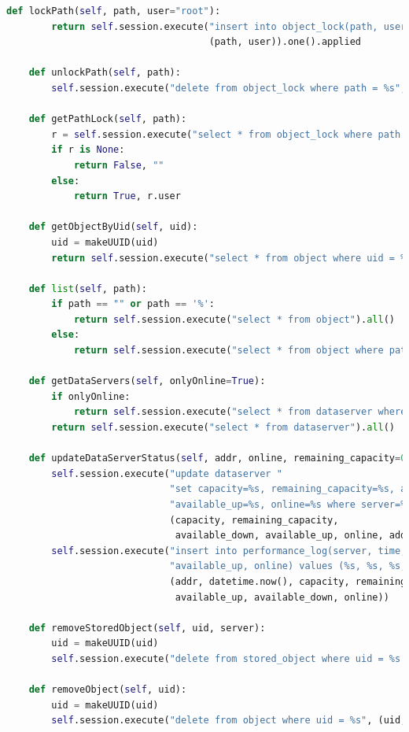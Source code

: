 \documentclass[11pt,a4paper,english]{article}
\begin{document}
\begin{lstlisting}[language=Python, title=Codice]
    def lockPath(self, path, user="root"):
        return self.session.execute("insert into object_lock(path, user) values (%s, %s) if not exists",
                                    (path, user)).one().applied

    def unlockPath(self, path):
        self.session.execute("delete from object_lock where path = %s", (path, ))

    def getPathLock(self, path):
        r = self.session.execute("select * from object_lock where path = %s", (path, )).one()
        if r is None:
            return False, ""
        else:
            return True, r.user

    def getObjectByUid(self, uid):
        uid = makeUUID(uid)
        return self.session.execute("select * from object where uid = %s", (uid, )).one()

    def list(self, path):
        if path == "" or path == '%':
            return self.session.execute("select * from object").all()
        else:
            return self.session.execute("select * from object where path like %s", (path, )).all()

    def getDataServers(self, onlyOnline=True):
        if onlyOnline:
            return self.session.execute("select * from dataserver where online=true allow filtering").all()
        return self.session.execute("select * from dataserver").all()

    def updateDataServerStatus(self, addr, online, remaining_capacity=0, capacity=0, available_down=.0, available_up=.0):
        self.session.execute("update dataserver "
                             "set capacity=%s, remaining_capacity=%s, available_down=%s, "
                             "available_up=%s, online=%s where server=%s",
                             (capacity, remaining_capacity,
                              available_down, available_up, online, addr))
        self.session.execute("insert into performance_log(server, time, capacity, remaining_capacity, available_down,"
                             "available_up, online) values (%s, %s, %s, %s, %s, %s, %s)",
                             (addr, datetime.now(), capacity, remaining_capacity,
                              available_up, available_down, online))

    def removeStoredObject(self, uid, server):
        uid = makeUUID(uid)
        self.session.execute("delete from stored_object where uid = %s and server = %s", (uid, server))

    def removeObject(self, uid):
        uid = makeUUID(uid)
        self.session.execute("delete from object where uid = %s", (uid, ))


\end{lstlisting}
\end{document}
